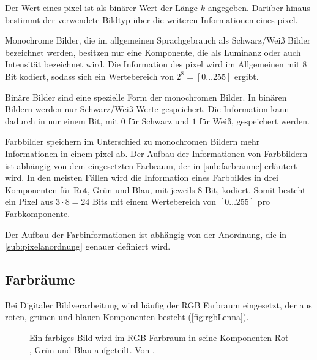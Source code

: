 Der Wert eines \gls{pixel} ist als binärer Wert der Länge $k$ angegeben. Darüber hinaus bestimmt der verwendete Bildtyp über die weiteren Informationen eines \gls{pixel}.

Monochrome Bilder, die im allgemeinen Sprachgebrauch als Schwarz/Weiß Bilder bezeichnet werden, besitzen nur eine Komponente, die als Luminanz oder auch Intensität bezeichnet wird. Die Information des \gls{pixel} wird im Allgemeinen mit 8 Bit kodiert, sodass sich ein Wertebereich von $2^8 = \left[0\dotsc255\right]$ ergibt.

Binäre Bilder sind eine spezielle Form der monochromen Bilder. In binären Bildern werden nur Schwarz/Weiß Werte gespeichert. Die Information kann dadurch in nur einem Bit, mit $0$ für Schwarz und $1$ für Weiß, gespeichert werden.

Farbbilder speichern im Unterschied zu monochromen Bildern mehr Informationen in einem \gls{pixel} ab. Der Aufbau der
Informationen von Farbbildern ist abhängig von dem eingesetzten Farbraum, der in \autoref{sub:farbräume} erläutert
wird. In den meisten Fällen wird die Information eines Farbbildes in drei Komponenten für Rot, Grün und Blau, mit
jeweils 8 Bit, kodiert. Somit besteht ein Pixel aus \(3 \cdot 8 = 24\) Bits mit einem Wertebereich von
\(\left[0 \dotsc 255\right]\) pro Farbkomponente.

Der Aufbau der Farbinformationen ist abhängig von der Anordnung, die in \autoref{sub:pixelanordnung} genauer definiert wird.


\subsection{Farbräume} %
\label{sub:farbräume}

Bei Digitaler Bildverarbeitung wird häufig der RGB Farbraum eingesetzt, der aus roten, grünen und blauen Komponenten besteht (\autoref{fig:rgbLenna}).

\begin{figure}[!ht]
	\centering
	\caption{Ein farbiges Bild  wird im RGB Farbraum in seine Komponenten Rot
		 , Grün  und Blau  aufgeteilt.
		Von \cite{lenna}.
	}
	\label{fig:rgbLenna}
\end{figure}

